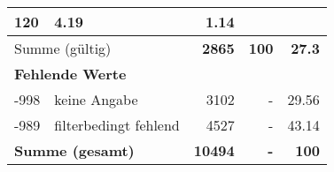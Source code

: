 \begin{longtable}{lXrrr}
       \num{120} &
       \num[round-mode=places,round-precision=2]{4.19} &
         \num[round-mode=places,round-precision=2]{1.14} \\
     \midrule
     \multicolumn{2}{l}{Summe (gültig)} &
       \textbf{\num{2865}} &
     \textbf{\num{100}} &
       \textbf{\num[round-mode=places,round-precision=2]{27.3}} \\
     \multicolumn{5}{l}{\textbf{Fehlende Werte}}\\
       -998 &
       keine Angabe &
         \num{3102} &
        - &
         \num[round-mode=places,round-precision=2]{29.56} \\
       -989 &
       filterbedingt fehlend &
         \num{4527} &
        - &
         \num[round-mode=places,round-precision=2]{43.14} \\
     \midrule
     \multicolumn{2}{l}{\textbf{Summe (gesamt)}} &
          \textbf{\num{10494}} &
        \textbf{-} &
        \textbf{\num{100}} \\
     \bottomrule
     \end{longtable}
     
